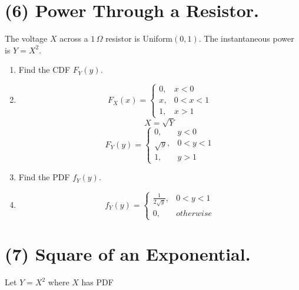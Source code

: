\documentclass[12pt]{article}
\newenvironment{bluetext}{\color{blue}}{}
\begin{document}
\vspace{1cm}
\newpage 

\section*{(6) Power Through a Resistor.}

The voltage $X$ across a $1\,\Omega$ resistor is Uniform$(0,1)$. The instantaneous power is $Y=X^{2}$.
\begin{enumerate}
    \item[(a)] Find the CDF $F_{Y}(y)$.
    \item[] \begin{bluetext}
        \[F_X(x)= \begin{cases}
        0, &x<0\\
        x,& 0<x<1\\
        1, &x>1
        \end{cases}\]
        \[X = \sqrt{Y}\]
        \[F_Y(y)= \begin{cases}
        0, &y<0\\
        \sqrt{y},& 0<y<1\\
        1, &y>1
        \end{cases}\]
    \end{bluetext}
    \item[(b)] Find the PDF $f_{Y}(y)$.
    \item[] \begin{bluetext}
        \[f_Y(y)=\begin{cases}
        \frac{1}{2\sqrt{y}}, & 0<y<1\\
        0, & otherwise
        \end{cases}\]
    \end{bluetext}
\end{enumerate}

\vspace{1cm}
\newpage

\section*{(7) Square of an Exponential.}

Let $Y=X^{2}$ where $X$ has PDF
\end{document}
